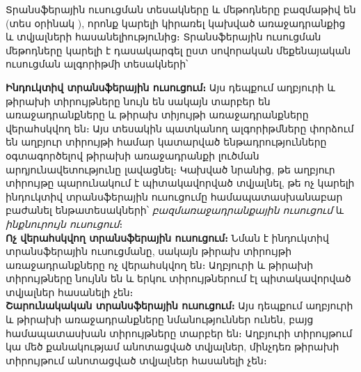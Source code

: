 \documentclass[12pt]{article}
\begin{document}
Տրանսֆերային ուսուցման տեսակները և մեթոդները բազմաթիվ են (տես օրինակ \cite{bib_item_1, bib_item_2, bib_item_3}), որոնք կարելի կիրառել կախված առաջադրանքից և տվյալների հասանելիությունից։ Տրանսֆերային ուսուցման մեթոդները կարելի է դասակարգել ըստ սովորական մեքենայական ուսուցման ալգորիթմի տեսակների՝ \linebreak

\noindent \textbf{Ինդուկտիվ տրանսֆերային ուսուցում։}  Այս դեպքում աղբյուրի և թիրախի տիրույթները նույն են սակայն տարբեր են առաջադրանքները և թիրախ տիյույթի առաջադրանքները վերահսկվող են։ Այս տեսակին պատկանող ալգորիթմները փորձում են աղբյուր տիրույթի համար կատարված ենթադրությունները օգտագործելով  թիրախի առաջադրանքի լուծման արդյունավետությունը լավացնել։ Կախված նրանից, թե աղբյուր տիրույթը պարունակում է պիտակավորված տվյալնել, թե ոչ  կարելի ինդուկտիվ տրանսֆերային ուսուցումը համապատասխանաբար բաժանել ենթատեսակների՝ \textit{բազմառաջադրանքային ուսուցում} և  \textit{ինքնուրույն ուսուցում}։\\

\noindent \textbf{Ոչ վերահսկվող տրանսֆերային ուսուցում։} Նման է ինդուկտիվ տրանսֆերային ուսուցմանը, սակայն թիրախ տիրույթի առաջադրանքները ոչ վերահսկվող  են։ Աղբյուրի և թիրախի տիրույթները  նույնն են և երկու տիրույթներում էլ պիտակավորված տվյալներ հասանելի չեն։ \\


\noindent \textbf{Շարունակական տրանսֆերային ուսուցում։}
Այս դեպքում աղբյուրի և թիրախի առաջադրանքները նմանություններ ունեն, բայց համապատասխան տիրույթները տարբեր են։ Աղբյուրի տիրույթում կա մեծ քանակությամ անոտացված տվյալներ, մինչդեռ թիրախի տիրույթում անոտացված տվյալներ հասանելի չեն։ \\

\begin{center}
\subsection*{
 } 
 \end{center}
 \noindent
{}
{}
\end{document}
